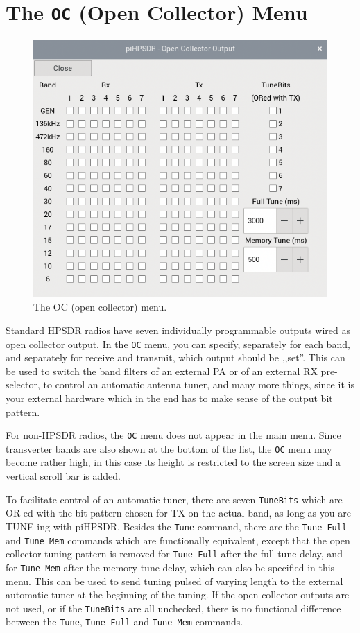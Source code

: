 \documentclass[12pt]{book}
\def\rett#1{\texttt{\color{red}#1}}
\def\bltt#1{\texttt{\color{blue}#1}}
\def\pH{pi\-HPSDR\xspace}
\begin{document}
\section{The \texttt{OC} (Open Collector) Menu}

\begin{figure}[ht]
\center
\includegraphics[scale=0.45]{OCMenu.png}
\caption{The OC (open collector) menu.}
\label{fig:OCMenu}
\end{figure}

Standard HPSDR radios have seven individually programmable outputs wired as
open collector output. In the \bltt{OC} menu, you can specify, separately
for each band, and separately for receive and transmit, which output should
be ,,set''. This can be used to switch the band filters of an external PA
or of an external RX pre-selector, to control an automatic antenna tuner,
and many more things, since it is
your external hardware which in the end has to make sense of the output
bit pattern.

For non-HPSDR radios, the \bltt{OC} menu does not appear in the main menu. Since
transverter bands are also shown at the bottom of the list, the \bltt{OC}
menu may become rather high, in this case its height is restricted to the
screen size and a vertical scroll bar is added.

To facilitate control of an automatic tuner, there are seven \rett{TuneBits}
which are OR-ed with the bit pattern chosen for TX on the actual band,
as long as you are TUNE-ing with \pH. Besides the \bltt{Tune} command,
there are the \bltt{Tune Full} and \bltt{Tune Mem} commands which are
functionally equivalent, except that the open collector tuning pattern
is removed for \bltt{Tune Full} after the full tune delay, and for \bltt{Tune Mem}
after the memory tune delay, which can also be specified in this menu.
This can be used to send tuning pulsed of varying length to the
external automatic tuner at the beginning of the tuning. If the open collector
outputs are not used, or if the \rett{TuneBits}  are all unchecked, there is
no functional difference between the \bltt{Tune}, \bltt{Tune Full} and
\bltt{Tune Mem} commands.
\end{document}
